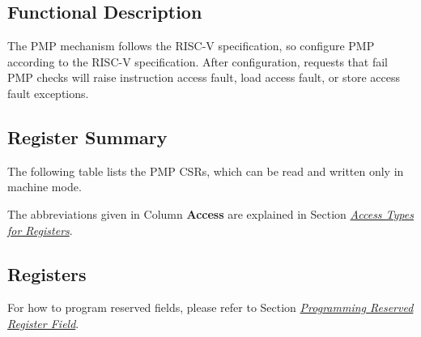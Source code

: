 \documentclass[main\_\_EN.tex]{subfiles}
\begin{document}
\subsection{Functional Description}
The PMP mechanism follows the RISC-V specification, so configure PMP according to the RISC-V specification. After configuration, requests that fail PMP checks will raise instruction access fault, load access fault, or store access fault exceptions.

\subsection{Register Summary}
The following table lists the PMP CSRs, which can be read and written only in machine mode.

The abbreviations given in Column \textbf{Access} are explained in Section \hyperref[glossary-access-types]{\textit{Access Types for Registers}}.





\subsection{Registers}

For how to program reserved fields, please refer to Section \hyperref[programming-reserved-field]{\textit{Programming Reserved Register Field}}.


\end{document}
